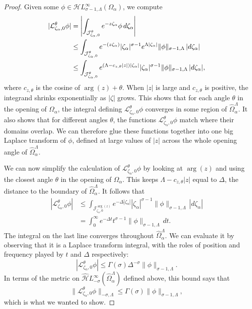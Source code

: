 \documentclass{article}
\let\Re\relax
\DeclareMathOperator{\Re}{Re}
\newcommand{\singexp}[2]{\mathcal{H}L^\infty_{#1, #2}}
\newcommand{\dualsingexp}[1]{\widehat{\mathcal{H}}L^\infty_{#1}}
\newcommand{\laplace}{\mathcal{L}}
\theoremstyle{definition}
\theoremstyle{plain}
\begin{document}
\begin{proof}
Given some $\phi \in \singexp{\sigma-1}{\Lambda}(\Omega_\alpha)$, we compute
\begin{align*}
|\laplace_{\zeta_\alpha, 0}^\theta \phi| & = \left| \int_{\mathcal{J}_{\zeta_\alpha, 0}^\theta} e^{-z\zeta_\alpha} \phi\,d\zeta_\alpha \right| \\
& \le \int_{\mathcal{J}_{\zeta_\alpha,0}^\theta} e^{-\Re(z\zeta_\alpha)} |\zeta_\alpha|^{\sigma-1} e^{\Lambda |\zeta_\alpha|} \|\phi\|_{\sigma-1, \Lambda}\,|d\zeta_\alpha| \\
& \le \int_{\mathcal{J}_{\zeta_\alpha,0}^\theta} e^{(\Lambda - c_{z, \theta}|z|)|\zeta_\alpha|} |\zeta_\alpha|^{\sigma-1} \|\phi\|_{\sigma-1, \Lambda}\,|d\zeta_\alpha|,
\end{align*}
where $c_{z, \theta}$ is the cosine of $\arg(z) + \theta$. When $|z|$ is large and $c_{z, \theta}$ is positive, the integrand shrinks exponentially as $|\zeta|$ grows. This shows that for each angle $\theta$ in the opening of $\Omega_\alpha$, the integral defining $\laplace_{\zeta_\alpha, 0}^\theta \phi$ converges in some region of $\widehat{\Omega}_\alpha^\Lambda$. It also shows that for different angles $\theta$, the functions $\laplace_{\zeta_\alpha, 0}^\theta \phi$ match where their domains overlap. We can therefore glue these functions together into one big Laplace transform of $\phi$, defined at large values of $|z|$ across the whole opening angle of $\widehat{\Omega}_\alpha^\Lambda$.

We can now simplify the calculation of $\laplace_{\zeta_\alpha, 0}^\theta \phi$ by looking at $\arg(z)$ and using the closest angle $\theta$ in the opening of $\Omega_\alpha$. This keeps $\Lambda - c_{z, \theta}|z|$ equal to $\Delta$, the distance to the boundary of $\widehat{\Omega}_\alpha^\Lambda$. It follows that
\begin{align*}
|\laplace_{\zeta_\alpha, 0}^\theta \phi| & \le \int_{\mathcal{J}_{\zeta_\alpha, 0}^{\arg(z)}} e^{-\Delta|\zeta_\alpha|} |\zeta_\alpha|^{\sigma-1} \|\phi\|_{\sigma-1, \Lambda}\,|d\zeta_\alpha| \\
& = \int_0^\infty e^{-\Delta t} t^{\sigma-1} \|\phi\|_{\sigma-1, \Lambda}\,dt.
\end{align*}
The integral on the last line converges throughout $\widehat{\Omega}_\alpha^\Lambda$. We can evaluate it by observing that it is a Laplace transform integral, with the roles of position and frequency played by $t$ and $\Delta$ respectively:
\[ |\laplace_{\zeta_\alpha, 0}^\theta \phi| \le \Gamma(\sigma) \Delta^{-\sigma} \|\phi\|_{\sigma-1, \Lambda}. \]
In terms of the metric on $\dualsingexp{-\sigma}(\widehat{\Omega}_\alpha^\Lambda)$ defined above, this bound says that
\[ \|\laplace_{\zeta_\alpha, 0}^\theta \phi\|_{-\sigma, \Lambda} \le \Gamma(\sigma) \|\phi\|_{\sigma-1, \Lambda}, \]
which is what we wanted to show.
\end{proof}
\end{document}
